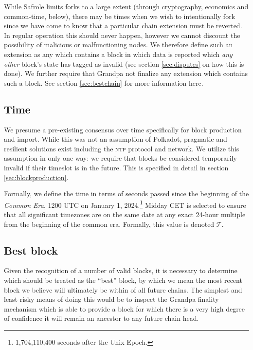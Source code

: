 While Safrole limits forks to a large extent (through cryptography, economics and common-time, below), there may be times when we wish to intentionally fork since we have come to know that a particular chain extension must be reverted. In regular operation this should never happen, however we cannot discount the possibility of malicious or malfunctioning nodes. We therefore define such an extension as any which contains a block in which data is reported which \emph{any other} block's state has tagged as invalid (see section \ref{sec:disputes} on how this is done). We further require that Grandpa not finalize any extension which contains such a block. See section \ref{sec:bestchain} for more information here.

\subsection{Time}\label{sec:commonera}

We presume a pre-existing consensus over time specifically for block production and import. While this was not an assumption of Polkadot, pragmatic and resilient solutions exist including the \textsc{ntp} protocol and network. We utilize this assumption in only one way: we require that blocks be considered temporarily invalid if their timeslot is in the future. This is specified in detail in section \ref{sec:blockproduction}.

Formally, we define the time in terms of seconds passed since the beginning of the \Jam\emph{Common Era}, 1200 UTC on January 1, 2024.\footnote{1,704,110,400 seconds after the Unix Epoch.} Midday CET is selected to ensure that all significant timezones are on the same date at any exact 24-hour multiple from the beginning of the common era. Formally, this value is denoted $\mathcal{T}$.

\subsection{Best block}

Given the recognition of a number of valid blocks, it is necessary to determine which should be treated as the ``best'' block, by which we mean the most recent block we believe will ultimately be within of all future \Jam chains. The simplest and least risky means of doing this would be to inspect the Grandpa finality mechanism which is able to provide a block for which there is a very high degree of confidence it will remain an ancestor to any future chain head.

